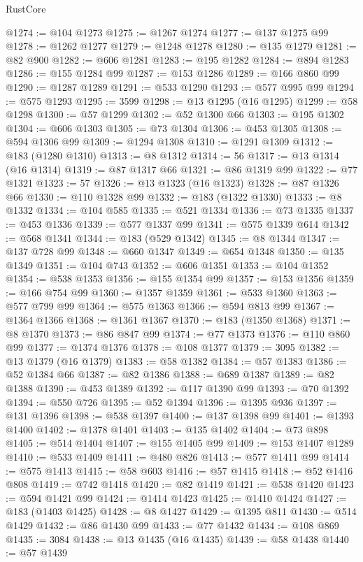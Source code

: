 \begin{lexlean}{RustCore}
\begin{coremodule}
@1274 := @104 @1273
@1275 := @1267 @1274
@1277 := @137 @1275 @99
@1278 := @1262 @1277
@1279 := @1248 @1278
@1280 := @135 @1279
@1281 := @82 @900
@1282 := @606 @1281
@1283 := @195 @1282
@1284 := @894 @1283
@1286 := @155 @1284 @99
@1287 := @153 @1286
@1289 := @166 @860 @99
@1290 := @1287 @1289
@1291 := @533 @1290
@1293 := @577 @995 @99
@1294 := @575 @1293
@1295 := 3599
@1298 := @13 @1295 (@16 @1295)
@1299 := @58 @1298
@1300 := @57 @1299
@1302 := @52 @1300 @66
@1303 := @195 @1302
@1304 := @606 @1303
@1305 := @73 @1304
@1306 := @453 @1305
@1308 := @594 @1306 @99
@1309 := @1294 @1308
@1310 := @1291 @1309
@1312 := @183 (@1280 @1310)
@1313 := @8 @1312
@1314 := 56
@1317 := @13 @1314 (@16 @1314)
@1319 := @87 @1317 @66
@1321 := @86 @1319 @99
@1322 := @77 @1321
@1323 := 57
@1326 := @13 @1323 (@16 @1323)
@1328 := @87 @1326 @66
@1330 := @110 @1328 @99
@1332 := @183 (@1322 @1330)
@1333 := @8 @1332
@1334 := @104 @585
@1335 := @521 @1334
@1336 := @73 @1335
@1337 := @453 @1336
@1339 := @577 @1337 @99
@1341 := @575 @1339 @614
@1342 := @568 @1341
@1344 := @183 (@529 @1342)
@1345 := @8 @1344
@1347 := @137 @728 @99
@1348 := @660 @1347
@1349 := @654 @1348
@1350 := @135 @1349
@1351 := @104 @743
@1352 := @606 @1351
@1353 := @104 @1352
@1354 := @538 @1353
@1356 := @155 @1354 @99
@1357 := @153 @1356
@1359 := @166 @754 @99
@1360 := @1357 @1359
@1361 := @533 @1360
@1363 := @577 @799 @99
@1364 := @575 @1363
@1366 := @594 @813 @99
@1367 := @1364 @1366
@1368 := @1361 @1367
@1370 := @183 (@1350 @1368)
@1371 := @8 @1370
@1373 := @86 @847 @99
@1374 := @77 @1373
@1376 := @110 @860 @99
@1377 := @1374 @1376
@1378 := @108 @1377
@1379 := 3095
@1382 := @13 @1379 (@16 @1379)
@1383 := @58 @1382
@1384 := @57 @1383
@1386 := @52 @1384 @66
@1387 := @82 @1386
@1388 := @689 @1387
@1389 := @82 @1388
@1390 := @453 @1389
@1392 := @117 @1390 @99
@1393 := @70 @1392
@1394 := @550 @726
@1395 := @52 @1394
@1396 := @1395 @936
@1397 := @131 @1396
@1398 := @538 @1397
@1400 := @137 @1398 @99
@1401 := @1393 @1400
@1402 := @1378 @1401
@1403 := @135 @1402
@1404 := @73 @898
@1405 := @514 @1404
@1407 := @155 @1405 @99
@1409 := @153 @1407 @1289
@1410 := @533 @1409
@1411 := @480 @826
@1413 := @577 @1411 @99
@1414 := @575 @1413
@1415 := @58 @603
@1416 := @57 @1415
@1418 := @52 @1416 @808
@1419 := @742 @1418
@1420 := @82 @1419
@1421 := @538 @1420
@1423 := @594 @1421 @99
@1424 := @1414 @1423
@1425 := @1410 @1424
@1427 := @183 (@1403 @1425)
@1428 := @8 @1427
@1429 := @1395 @811
@1430 := @514 @1429
@1432 := @86 @1430 @99
@1433 := @77 @1432
@1434 := @108 @869
@1435 := 3084
@1438 := @13 @1435 (@16 @1435)
@1439 := @58 @1438
@1440 := @57 @1439

\end{coremodule}
\end{lexlean}
